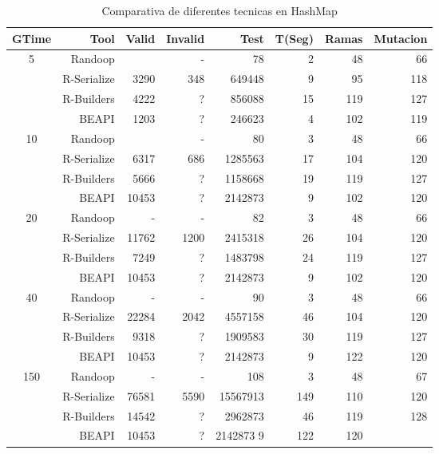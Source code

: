 \begin{table}[H]
\scriptsize
\centering
\label{tab:results-obj1}
\begin{tabular}{ c  r  |r | r | r|r|r|r  }
  \toprule
  \textbf{GTime} & \textbf{Tool} & \textbf{Valid}  & \textbf{Invalid} & \textbf{Test}&\textbf{T(Seg)} &\textbf{Ramas}  & \textbf{Mutacion} \\ 
  \midrule
5	&	Randoop	&		&	-	&	78	&	2	&	48	&	66	\\
	&	R-Serialize	&	3290	&	348	&	649448	&	9	&	95	&	118	\\
	&	R-Builders	&	4222	&	?	&	856088	&	15	&	119	&	127	\\
	&	BEAPI	&	1203	&	?	&	246623	&	4	&	102	&	119	 \\
 \cline{2-8}															
10	&	Randoop	&		&	-	&	80	&	3	&	48	&	66	\\
	&	R-Serialize	&	6317	&	686	&	1285563	&	17	&	104	&	120	\\
	&	R-Builders	&	5666	&	?	&	1158668	&	19	&	119	&	127	\\
	&	BEAPI	&	10453	&	?	&	2142873	&	9	&	102	&	120	\\
 \cline{2-8}															
20	&	Randoop	&	-	&	-	&	82	&	3	&	48	&	66	\\
	&	R-Serialize	&	11762	&	1200	&	2415318	&	26	&	104	&	120	\\
	&	R-Builders	&	7249	&	?	&	1483798	&	24	&	119	&	127	\\
	&	BEAPI	&	10453	&	?	&	2142873	&	9	&	102	&	120	 \\
 \cline{2-8}															
40	&	Randoop	&	-	&	-	&	90	&	3	&	48	&	66	\\
	&	R-Serialize	&	22284	&	2042	&	4557158	&	46	&	104	&	120	\\
	&	R-Builders	&	9318	&	?	&	1909583	&	30	&	119	&	127	\\
	&	BEAPI	&	10453	&	?	&	2142873	&	9	&	122	&	120	\\ 
 \cline{2-8}															
150	&	Randoop	&	-	&	-	&	108	&	3	&	48	&	67	\\
	&	R-Serialize	&	76581	&	5590	&	15567913	&	149	&	110	&	120	\\
	&	R-Builders	&	14542	&	?	&	2962873	&	46	&	119	&	128	\\
	&	BEAPI	&	10453	&	?	&	2142873		9	&	122	&	120		\\
\midrule
\end{tabular}
\caption{Comparativa de diferentes tecnicas en HashMap}
\end{table}
